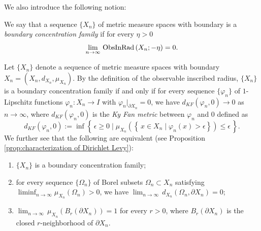 We also introduce the following notion:
\begin{defi}\label{defi:Dirichlet Levy family}
We say that
a sequence $\{X_{n}\}$ of metric measure spaces with boundary is a \textit{boundary concentration family} if
for every $\eta>0$
\begin{equation*}
\lim_{n\to \infty} \, \operatorname{ObsInRad} \left(X_{n};-\eta \right)=0.
\end{equation*}
\end{defi}

\begin{rem}\label{rem:characterization of Dirichlet Levy}
Let $\{X_{n}\}$ denote a sequence of metric measure spaces with boundary $X_{n}=(X_{n},d_{X_{n}},\mu_{X_{n}})$.
By the definition of the observable inscribed radius,
$\{X_{n}\}$ is a boundary concentration family if and only if
for every sequence $\{\varphi_{n}\}$ of $1$-Lipschitz functions $\varphi_{n}:X_{n}\to I$ with $\varphi_{n}|_{\partial X_{n}}=0$,
we have $d_{KF}(\varphi_{n},0) \to 0$ as $n\to \infty$,
where $d_{KF}(\varphi_{n},0)$ is the \textit{Ky Fan metric} between $\varphi_{n}$ and $0$ defined as
\begin{equation*}
d_{KF}(\varphi_{n},0):=\inf \left\{\, \epsilon \geq 0 \mid \mu_{X_{n}} \left(  \left\{\, x\in X_{n} \mid \varphi_{n}(x)>\epsilon \right\} \right) \leq \epsilon \,\right\}.
\end{equation*}
We further see that the following are equivalent (see Proposition \ref{prop:characterization of Dirichlet Levy}):
\begin{enumerate}\setlength{\itemsep}{+0.7mm}
\item $\{X_{n}\}$ is a boundary concentration family;
\item for every sequence $\{\Omega_{n}\}$ of Borel subsets $\Omega_{n} \subset X_{n}$ satisfying $\liminf_{n\to \infty} \mu_{X_{n}}(\Omega_{n})>0$,
         we have $\lim_{n\to \infty}\, d_{X_{n}}(\Omega_{n},\partial X_{n})=0$;
\item $\lim_{n\to \infty}\,\mu_{X_{n}}(B_{r}(\partial X_{n}))=1$ for every $r>0$,
         where $B_{r}(\partial X_{n})$ is the closed $r$-neighborhood of $\partial X_{n}$.
\end{enumerate}
\end{rem}

